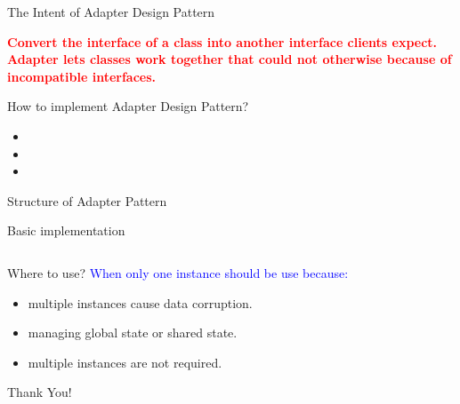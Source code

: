 \documentclass[13pt]{beamer}
\begin{document}
\begin{frame}{The Intent of Adapter Design Pattern}
	\begin{center}
	\textcolor{red}{\textbf{Convert the interface of a class into another interface clients expect. Adapter lets classes work together that could not otherwise because of incompatible interfaces.}}\\
	\end{center}
\end{frame}

\begin{frame}{How to implement Adapter Design Pattern?}
	\begin{itemize}
		\setlength\itemsep{2em}
		\item 
		\item 
		\item 
	\end{itemize}
\end{frame}

\begin{frame}{Structure of Adapter Pattern}
	\begin{center}
	\end{center}
\end{frame}

\begin{frame}{Basic implementation}
\begin{columns}[T]
\begin{column}{.45\textwidth}
\lstset{basicstyle=\tiny,style=myCustomCppStyle}

\end{column}

\begin{column}{.45\textwidth}
\lstset{basicstyle=\tiny,style=myCustomCppStyle}
\end{column}
\end{columns}
\end{frame}

\begin{frame}{Where to use?}
	\textcolor{blue}{When only one instance should be use because:}
	\begin{itemize}
		\setlength\itemsep{1em}
		\item multiple instances cause data corruption.
		\item managing global state or shared state.
		\item multiple instances are not required.
	\end{itemize}
\end{frame}

\begin{frame}
\begin{center}
{\fontsize{40}{50}\selectfont Thank You!}
\end{center}
\end{frame}
\end{document}
